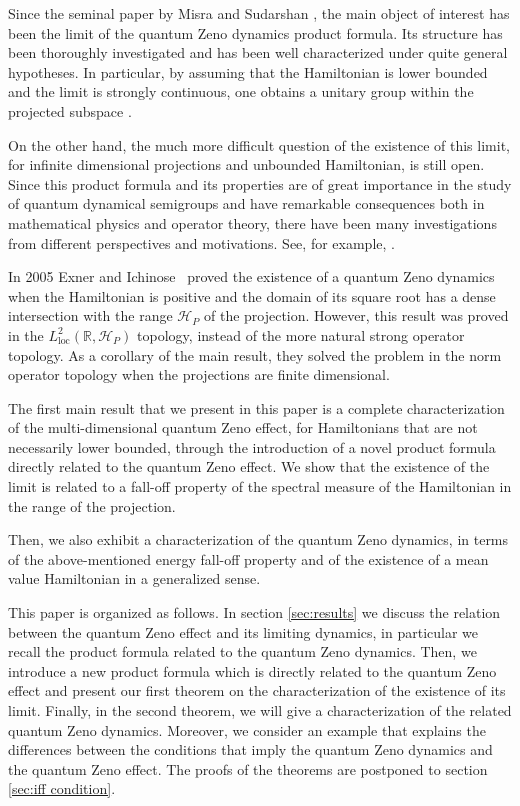 \documentclass[aip,jmp,12pt
]{revtex4}
\newcommand{\RM}{\mathbb{R}}
\theoremstyle{definition}
\begin{document}
Since the seminal paper by Misra and Sudarshan \cite{misra}, the
main object of interest has been the limit of the
quantum Zeno dynamics product formula.
Its structure has been thoroughly investigated and has been well characterized under quite general
hypotheses. In particular, by assuming that  the Hamiltonian is lower bounded and the limit is strongly continuous, one obtains  a unitary group within the projected subspace \cite{misra,Exnerbook}.

On the other hand, the much more difficult question
of the existence of this limit, for infinite dimensional projections and unbounded Hamiltonian,
is still open.
Since this product formula and its properties are of great
importance in the  study of quantum dynamical semigroups and
have remarkable consequences both in mathematical
physics and operator theory, there have been many investigations
from different perspectives and motivations. See, for example, \cite{Friedman72,Friedman1,gustafsonmisra,Schmidt02,Schmidt03,Matolcsi03,EINZ}.


 In 2005 Exner and Ichinose~\cite{exner} proved the existence of a quantum Zeno dynamics when the Hamiltonian is positive and the domain of its square root has a dense intersection with the range $\mathcal{H}_P$ of the projection. However, this result was proved in the $L^2_{\textrm{loc}}(\RM,\mathcal{H}_P)$ topology, instead of the more natural strong operator topology.
As a corollary of the main result, they
solved the problem in the norm operator topology when the projections are finite dimensional.

The first main result that we present in this paper is a complete characterization
of the multi-dimensional quantum Zeno effect, for Hamiltonians that are not
necessarily lower bounded, through the introduction of a novel
product formula directly related to the quantum Zeno effect.
 We show that the existence of the limit is related to
a fall-off property of the spectral measure of the Hamiltonian in
the range of the projection.

Then, we also exhibit a characterization of the quantum Zeno dynamics, in terms of the above-mentioned energy fall-off property and of the existence of a mean value Hamiltonian in a generalized sense.

This paper is organized as follows. In section \ref{sec:results} we discuss the relation
between the quantum Zeno effect and its limiting dynamics, in particular
we recall the product formula related to the quantum Zeno dynamics.
Then, we introduce a new product formula which is
directly related to the quantum Zeno effect and present our first theorem on the
characterization of the existence of its limit.
Finally, in the second theorem, we will give  a characterization of the related quantum Zeno dynamics.
Moreover,  we consider  an
example that explains  the differences between the
conditions that imply the quantum Zeno dynamics and the quantum Zeno effect.
The proofs of the theorems are postponed to section \ref{sec:iff condition}.
\end{document}
